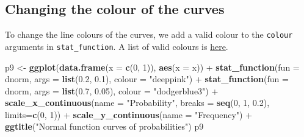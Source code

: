 \documentclass[]{article}
\newenvironment{Shaded}{\begin{snugshade}}{\end{snugshade}}
\newcommand{\KeywordTok}[1]{\textcolor[rgb]{0.13,0.29,0.53}{\textbf{{#1}}}}
\newcommand{\DataTypeTok}[1]{\textcolor[rgb]{0.13,0.29,0.53}{{#1}}}
\newcommand{\DecValTok}[1]{\textcolor[rgb]{0.00,0.00,0.81}{{#1}}}
\newcommand{\FloatTok}[1]{\textcolor[rgb]{0.00,0.00,0.81}{{#1}}}
\newcommand{\StringTok}[1]{\textcolor[rgb]{0.31,0.60,0.02}{{#1}}}
\newcommand{\NormalTok}[1]{{#1}}
\begin{document}
\subsection{Changing the colour of the
curves}\label{changing-the-colour-of-the-curves-1}

To change the line colours of the curves, we add a valid colour to the
\texttt{colour} arguments in \texttt{stat\_function}. A list of valid
colours is
\href{http://www.stat.columbia.edu/~tzheng/files/Rcolor.pdf}{here}.

\begin{Shaded}
\begin{Highlighting}[]
\NormalTok{p9 <-}\StringTok{ }\KeywordTok{ggplot}\NormalTok{(}\KeywordTok{data.frame}\NormalTok{(}\DataTypeTok{x =} \KeywordTok{c}\NormalTok{(}\DecValTok{0}\NormalTok{, }\DecValTok{1}\NormalTok{)), }\KeywordTok{aes}\NormalTok{(}\DataTypeTok{x =} \NormalTok{x)) +}
\StringTok{        }\KeywordTok{stat_function}\NormalTok{(}\DataTypeTok{fun =} \NormalTok{dnorm, }\DataTypeTok{args =} \KeywordTok{list}\NormalTok{(}\FloatTok{0.2}\NormalTok{, }\FloatTok{0.1}\NormalTok{),}
                      \DataTypeTok{colour =} \StringTok{"deeppink"}\NormalTok{) +}
\StringTok{        }\KeywordTok{stat_function}\NormalTok{(}\DataTypeTok{fun =} \NormalTok{dnorm, }\DataTypeTok{args =} \KeywordTok{list}\NormalTok{(}\FloatTok{0.7}\NormalTok{, }\FloatTok{0.05}\NormalTok{),}
                      \DataTypeTok{colour =} \StringTok{"dodgerblue3"}\NormalTok{) +}
\StringTok{        }\KeywordTok{scale_x_continuous}\NormalTok{(}\DataTypeTok{name =} \StringTok{"Probability"}\NormalTok{,}
                              \DataTypeTok{breaks =} \KeywordTok{seq}\NormalTok{(}\DecValTok{0}\NormalTok{, }\DecValTok{1}\NormalTok{, }\FloatTok{0.2}\NormalTok{),}
                              \DataTypeTok{limits=}\KeywordTok{c}\NormalTok{(}\DecValTok{0}\NormalTok{, }\DecValTok{1}\NormalTok{)) +}
\StringTok{        }\KeywordTok{scale_y_continuous}\NormalTok{(}\DataTypeTok{name =} \StringTok{"Frequency"}\NormalTok{) +}
\StringTok{        }\KeywordTok{ggtitle}\NormalTok{(}\StringTok{"Normal function curves of probabilities"}\NormalTok{)}
\NormalTok{p9}
\end{Highlighting}
\end{Shaded}
\end{document}
